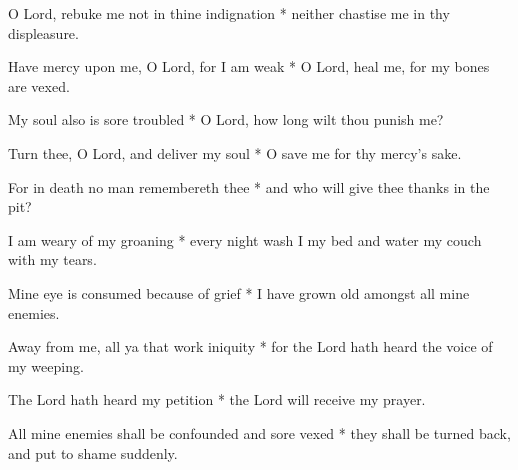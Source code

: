 O Lord, rebuke me not in thine indignation * neither chastise me in thy displeasure.

Have mercy upon me, O Lord, for I am weak * O Lord, heal me, for my bones are vexed.

My soul also is sore troubled * O Lord, how long wilt thou punish me?

Turn thee, O Lord, and deliver my soul * O save me for thy mercy's sake.

For in death no man remembereth thee * and who will give thee thanks in the pit?

I am weary of my groaning * every night wash I my bed and water my couch with my tears.

Mine eye is consumed because of grief * I have grown old amongst all mine enemies.

Away from me, all ya that work iniquity * for the Lord hath heard the voice of my weeping.

The Lord hath heard my petition * the Lord will receive my prayer.

All mine enemies shall be confounded and sore vexed * they shall be turned back, and put to shame suddenly.